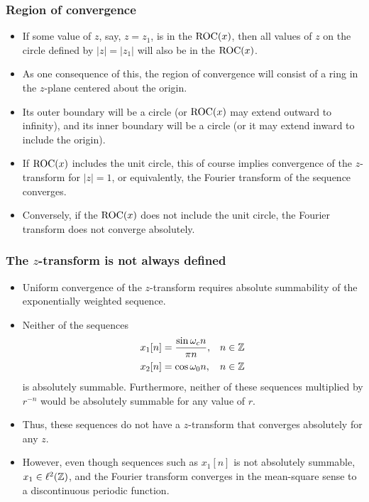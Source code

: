 \begin{frame}
\frametitle{Region of convergence}
\begin{itemize}
\item If some value of $z$, say, $z=z_{1}$, is in the $\mathrm{ROC}(x)$, then all values of $z$ on the circle defined by $|z|=|z_{1}|$ will also be in the $\mathrm{ROC}(x)$.
\item  As one consequence of this, the region of convergence will consist of a ring in the $z$-plane centered about the origin.
\item  Its outer boundary will be a circle (or $\mathrm{ROC}(x)$ may extend outward to infinity), and its inner boundary will be a circle (or it may extend inward to include the origin).
\item If $\mathrm{ROC}(x)$ includes the unit circle, this of course implies convergence of the $z$-transform for $|z|=1$, or equivalently, the Fourier transform of the sequence converges.
\item Conversely, if the $\mathrm{ROC}(x)$ does not include the unit circle, the Fourier transform does not converge absolutely.
\end{itemize}
\end{frame}


\begin{frame}
\frametitle{The $z$-transform is not always defined}
\begin{itemize}
\item Uniform convergence of the $z$-transform requires absolute summability of the exponentially weighted sequence.
\item Neither of the sequences
\begin{align*}
x_{1}[n] &=\frac{\sin\omega_{c}n}{\pi n}, && n \in \mathbb{Z} \\
x_{2}[n] &=\cos\omega_{0}n,&& n \in \mathbb{Z}
\end{align*}
is absolutely summable. Furthermore, neither of these sequences multiplied by $r^{-n}$ would be absolutely summable for any value of $r$.
\item Thus, these sequences do not have a $z$-transform that converges absolutely for any $z$.
\item However,  even though sequences such as $x_{1}[n]$ is not absolutely summable, $x_1 \in \ell^2(\mathbb{Z})$, and the Fourier transform converges in the mean-square sense to a discontinuous periodic function.
\end{itemize}
\end{frame}

